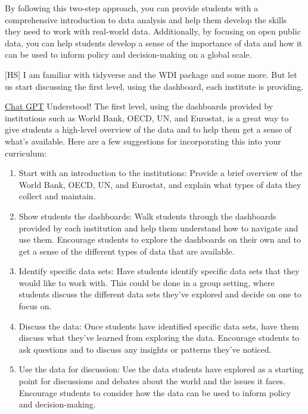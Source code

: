 \documentclass[
]{book}
\providecommand{\tightlist}{%
  \setlength{\itemsep}{0pt}\setlength{\parskip}{0pt}}
\theoremstyle{definition}
\theoremstyle{definition}
\theoremstyle{definition}
\theoremstyle{definition}
\theoremstyle{remark}
\begin{document}
By following this two-step approach, you can provide students with a comprehensive introduction to data analysis and help them develop the skills they need to work with real-world data. Additionally, by focusing on open public data, you can help students develop a sense of the importance of data and how it can be used to inform policy and decision-making on a global scale.

{[}HS{]} I am familiar with tidyverse and the WDI package and some more. But let us start discussing the first level, using the dashboard, each institute is providing.

\protect\hyperlink{chatgpt}{Chat GPT} Understood! The first level, using the dashboards provided by institutions such as World Bank, OECD, UN, and Eurostat, is a great way to give students a high-level overview of the data and to help them get a sense of what's available. Here are a few suggestions for incorporating this into your curriculum:

\begin{enumerate}
\def\labelenumi{\arabic{enumi}.}
\tightlist
\item
  Start with an introduction to the institutions: Provide a brief overview of the World Bank, OECD, UN, and Eurostat, and explain what types of data they collect and maintain.
\item
  Show students the dashboards: Walk students through the dashboards provided by each institution and help them understand how to navigate and use them. Encourage students to explore the dashboards on their own and to get a sense of the different types of data that are available.
\item
  Identify specific data sets: Have students identify specific data sets that they would like to work with. This could be done in a group setting, where students discuss the different data sets they've explored and decide on one to focus on.
\item
  Discuss the data: Once students have identified specific data sets, have them discuss what they've learned from exploring the data. Encourage students to ask questions and to discuss any insights or patterns they've noticed.
\item
  Use the data for discussion: Use the data students have explored as a starting point for discussions and debates about the world and the issues it faces. Encourage students to consider how the data can be used to inform policy and decision-making.
\end{enumerate}
\end{document}

